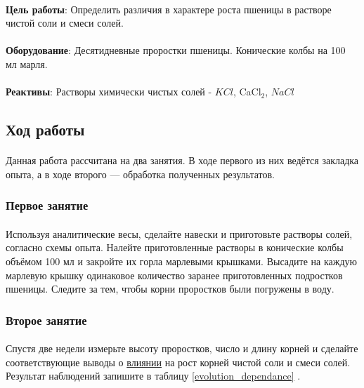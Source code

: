 \paragraph*{}\textbf{Цель работы}: Определить различия в характере роста пшеницы в растворе чистой соли и смеси солей.

\paragraph*{}\textbf{Оборудование}: Десятидневные проростки пшеницы. Конические колбы на 100 мл марля.

\paragraph*{}\textbf{Реактивы}: Растворы химически чистых солей - $KCl$, CaCl${_2}$, $NaCl$

	\subsection*{Ход работы}
	
\paragraph*{}Данная работа рассчитана на два занятия. В ходе первого из них ведётся закладка опыта, а в ходе второго — обработка полученных результатов.
	
	\subsubsection*{Первое занятие}
	
	\paragraph*{}Используя аналитические весы, сделайте навески и приготовьте растворы солей, согласно схемы опыта. Налейте приготовленные растворы в конические колбы объёмом 100 мл и закройте их горла марлевыми крышками. Высадите на каждую марлевую крышку одинаковое количество заранее приготовленных подростков пшеницы. Следите за тем, чтобы корни проростков были погружены в воду.
	
	\subsubsection*{Второе занятие}
	
\paragraph*{}Спустя две недели измерьте высоту проростков, число и длину корней и сделайте соответствующие выводы о \hyperlink{growth_question}{влиянии} на рост корней чистой соли и смеси солей. Результат наблюдений запишите в таблицу \ref{evolution_dependance} \cite{tretiakow_fzr}. 
	
